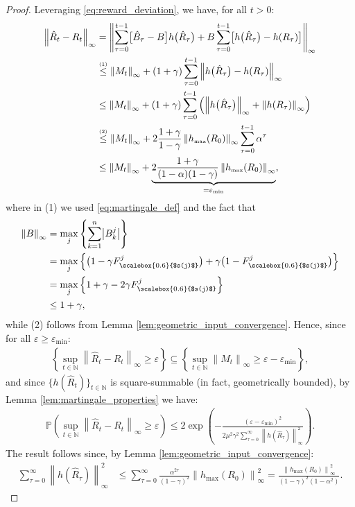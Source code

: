 \documentclass[10pt,leqno]{amsart}
\newcommand{\sml}{\scriptscriptstyle}
\newcommand{\stkrl}[2]{\stackrel{\text{\tiny{(#1)}}}{#2}}
\newcommand{\norm}[1]{\left \|#1 \right \|}
\newcommand{\N}{\mathbb{N}}
\newcommand{\Cost}{R}
\newcommand{\F}{F}
\newcommand{\disc}{\gamma}
\newcommand{\proj}{s}
\newcommand{\B}{B}
\newcommand{\infnorm}[1]{\norm{#1}_\infty}
\newcommand{\outmap}{h_{\sml \text{max}}}
\newcommand{\threshold}{\varepsilon_{\sml \text{min}}}
\newcommand{\prob}{\mathbb{P}}
\newcommand{\Bapx}{\hat{B}}
\newcommand{\Costpert}{\hat{\Cost}}
\begin{document}
\begin{proof}
    Leveraging \eqref{eq:reward_deviation}, we have, for all $t > 0$:
    \begin{align}
        \infnorm{\Costpert_t - \Cost_t} &= \infnorm{\sum_{\tau = 0}^{t-1} \bigl[\Bapx_\tau - \B\bigr] h\bigl(\Costpert_\tau\bigr) + \B \sum_{\tau = 0}^{t-1} \bigl[h\bigl(\Costpert_\tau\bigr) - h(\Cost_\tau)\bigr]} \notag\\
        &\stkrl{1}{\leq} \infnorm{M_t} + (1 + \disc) \sum_{\tau = 0}^{t-1} \infnorm{h\bigl(\Costpert_\tau\bigr) - h(\Cost_\tau)} \notag\\
        &\leq \infnorm{M_t} + (1 + \disc) \sum_{\tau = 0}^{t-1} \left(\infnorm{h\bigl(\Costpert_\tau\bigr)} + \infnorm{h(\Cost_\tau)}\right) \notag\\
        &\stkrl{2}{\leq} \infnorm{M_t} + 2\frac{1 + \disc}{1 - \disc} \infnorm{\outmap(\Cost_0)}\sum_{\tau = 0}^{t - 1} \alpha^\tau \label{eq:improvable_bound}\\
        &\leq \infnorm{M_t} + \underbrace{2\frac{1 + \disc}{(1 - \alpha)(1 - \disc)} \infnorm{\outmap(\Cost_0)}}_{= \threshold} \notag,
    \end{align}
    where in (1) we used \eqref{eq:martingale_def} and the fact that
    \begin{align*}
        \infnorm{\B} &= \max_j\left\{\sum_{k = 1}^n\bigl|\B_k^j\bigr|\right\}\\
        &= \max_j\left\{\bigl(1 - \disc \F_{\scalebox{0.6}{$\proj(j)$}}^j\bigr) + \disc\bigl(1 - \F_{\scalebox{0.6}{$\proj(j)$}}^j\bigr)\right\}\\
        &= \max_j\left\{1 + \disc - 2 \disc \F_{\scalebox{0.6}{$\proj(j)$}}^j\right\}\\
        &\leq 1 + \disc,
    \end{align*}
    while (2) follows from Lemma \ref{lem:geometric_input_convergence}. Hence, since for all $\varepsilon \geq \threshold$:
    \begin{align}
        \left\{ \sup_{t \in \N} \infnorm{\Costpert_t - \Cost_t} \geq \varepsilon \right\} \subseteq \left\{ \sup_{t \in \N} \infnorm{M_t} \geq \varepsilon - \threshold \right\},
    \end{align}
    and since $\{h(\Costpert_t)\}_{t \in \N}$ is square-summable (in fact, geometrically bounded), by Lemma \ref{lem:martingale_properties} we have:
    \begin{align*}
        \prob\left(\sup_{t \in \N} \infnorm{\Costpert_t - \Cost_t} \geq \varepsilon\right) \leq 2 \exp\left(-\frac{(\varepsilon - \threshold)^2}{2\mu^2\disc^2\sum_{\tau = 0}^\infty \infnorm{h(\Costpert_\tau)}^2}\right).
    \end{align*}
    The result follows since, by Lemma \ref{lem:geometric_input_convergence}:
    \begin{align*}
        \sum_{\tau = 0}^\infty \infnorm{h(\Costpert_\tau)}^2 &\leq \sum_{\tau = 0}^\infty \frac{\alpha^{2\tau}}{(1 - \disc)^2} \infnorm{\outmap(\Cost_0)}^2 = \frac{\infnorm{\outmap(\Cost_0)}^2}{(1 - \disc)^2(1 - \alpha^2)}.
    \end{align*}
\end{proof}
\end{document}
